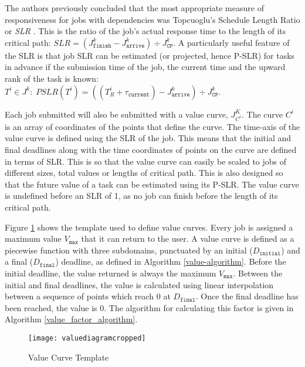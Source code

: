 \documentclass[english,british]{IEEEtran}
\begin{document}
The authors previously concluded \cite{burkimsher12} that the most
appropriate measure of responsiveness for jobs with dependencies was
Topcuoglu's Schedule Length Ratio or \emph{SLR} \cite{Topcuoglu2002}.
This is the ratio of the job's actual response time to the length
of its critical path: $SLR=\left(J_{\mathtt{finish}}^{k}-J_{\mathtt{arrive}}^{k}\right)\div J_{\mathtt{CP}}^{k}$.
A particularly useful feature of the SLR is that job SLR can be estimated
(or projected, hence P-SLR) for tasks in advance if the submission
time of the job, the current time and the upward rank of the task
is known: $T^{i}\in J^{k}:\;PSLR\left(T^{i}\right)=\left(\left(T_{R}^{i}+\tau_{\mathtt{current}}\right)-J_{\mathtt{arrive}}^{k}\right)\div J_{\mathtt{CP}}^{k}$.

Each job submitted will also be submitted with a value curve, $J_{C^{i}}^{K}$.
The curve $C^{i}$ is an array of coordinates of the points that define
the curve. The time-axis of the value curve is defined using the SLR
of the job. This means that the initial and final deadlines along
with the time coordinates of points on the curve are defined in terms
of SLR. This is so that the value curve can easily be scaled to jobs
of different sizes, total values or lengths of critical path. This
is also designed so that the future value of a task can be estimated
using its P-SLR. The value curve is undefined before an SLR of 1,
as no job can finish before the length of its critical path. 

Figure \ref{value-curve-template-pic} shows the template used to
define value curves. Every job is assigned a maximum value $V_{\mathtt{max}}$
that it can return to the user. A value curve is defined as a piecewise
function with three subdomains, punctuated by an initial ($D_{\mathtt{initial}}$)
and a final ($D_{\mathtt{final}}$) deadline, as defined in Algorithm
\ref{value-algorithm}. Before the initial deadline, the value returned
is always the maximum $V_{\mathtt{max}}$. Between the initial and
final deadlines, the value is calculated using linear interpolation
between a sequence of points which reach 0 at $D_{\mathtt{final}}$.
Once the final deadline has been reached, the value is 0. The algorithm
for calculating this factor is given in Algorithm \ref{value_factor_algorithm}.

\begin{figure}
\noindent \begin{centering}
\texttt{[image: valuediagramcropped]}
\par\end{centering}

\protect\caption{Value Curve Template}


\label{value-curve-template-pic}
\end{figure}
\end{document}

